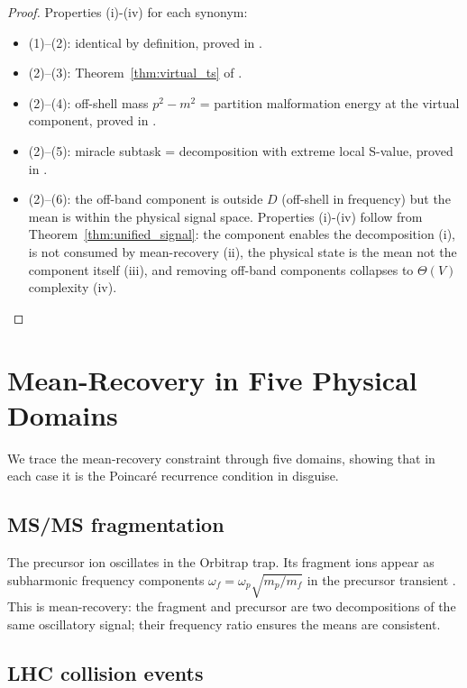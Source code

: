 \documentclass[twocolumn,10pt,a4paper]{article}
\theoremstyle{thmstyle}
\theoremstyle{definition}
\theoremstyle{remark}
\begin{document}
\begin{proof}
Properties (i)-(iv) for each synonym:
\begin{itemize}[nosep]
\item (1)--(2): identical by definition, proved in \citealt{companion:trajectory}.
\item (2)--(3): Theorem~\ref{thm:virtual_ts} of \citealt{companion:graph}.
\item (2)--(4): off-shell mass $p^2 - m^2$ = partition malformation energy
  at the virtual component, proved in \citealt{companion:virtual}.
\item (2)--(5): miracle subtask = decomposition with extreme local S-value,
  proved in \citealt{companion:trajectory}.
\item (2)--(6): the off-band component is outside $D$ (off-shell in frequency)
  but the mean is within the physical signal space.  Properties (i)-(iv)
  follow from Theorem~\ref{thm:unified_signal}: the component enables the
  decomposition (i), is not consumed by mean-recovery (ii), the physical
  state is the mean not the component itself (iii), and removing off-band
  components collapses to $\Theta(V)$ complexity (iv).
\end{itemize}
\end{proof}

\section{Mean-Recovery in Five Physical Domains}
\label{sec:domains}

We trace the mean-recovery constraint through five domains, showing that
in each case it is the Poincar\'e recurrence condition in disguise.

\subsection{MS/MS fragmentation}

The precursor ion oscillates in the Orbitrap trap.  Its fragment ions
appear as subharmonic frequency components $\omega_f = \omega_p\sqrt{m_p/m_f}$
in the precursor transient \citep{companion:tensor}.  This is mean-recovery:
the fragment and precursor are two decompositions of the same oscillatory
signal; their frequency ratio ensures the means are consistent.

\subsection{LHC collision events}
\end{document}
